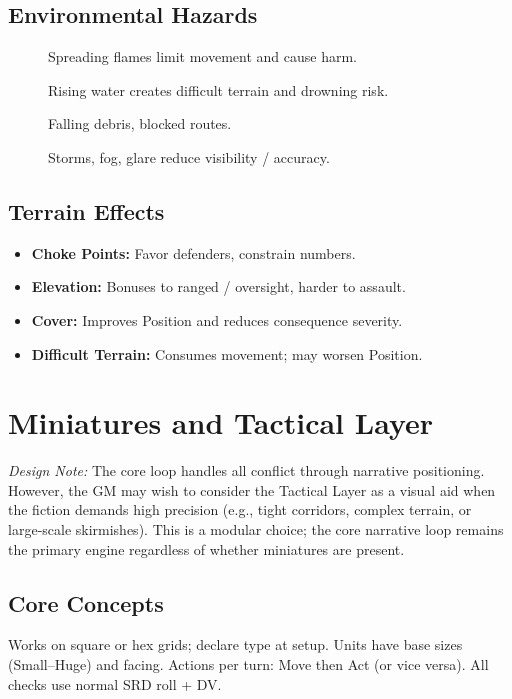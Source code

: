 \subsection{Environmental Hazards}\label{subsec:environmental_hazards}
\begin{description}
    \item[] Spreading flames limit movement and cause harm.
    \item[] Rising water creates difficult terrain and drowning risk.
    \item[] Falling debris, blocked routes.
    \item[] Storms, fog, glare reduce visibility / accuracy.
\end{description}

\subsection{Terrain Effects}\label{subsec:terrain_effects}
\begin{itemize}
    \item \textbf{Choke Points:} Favor defenders, constrain numbers.
    \item \textbf{Elevation:} Bonuses to ranged / oversight, harder to assault.
    \item \textbf{Cover:} Improves Position and reduces consequence severity.
    \item \textbf{Difficult Terrain:} Consumes movement; may worsen Position.
\end{itemize}

\section{Miniatures and Tactical Layer}\label{sec:miniatures}

\textit{Design Note:} The core loop handles all conflict through narrative positioning. However, the GM may wish to consider the Tactical Layer as a visual aid when the fiction demands high precision (e.g., tight corridors, complex terrain, or large‑scale skirmishes). This is a modular choice; the core narrative loop remains the primary engine regardless of whether miniatures are present.

\subsection{Core Concepts}
Works on square or hex grids; declare type at setup. Units have base sizes (Small--Huge) and facing. Actions per turn: Move then Act (or vice versa). All checks use normal SRD roll + DV.

